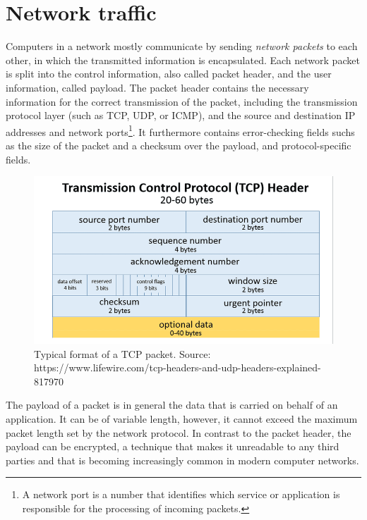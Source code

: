 
\section{Network traffic}\label{traffic}



Computers in a network mostly communicate by sending \textit{network packets} to each other, in which the transmitted information is encapsulated. Each network packet is split into the control information, also called packet header, and the user information, called payload. The packet header contains the necessary information for the correct transmission of the packet, including the transmission protocol layer (such as TCP, UDP, or ICMP), and the source and destination IP addresses and network ports\footnote{A network port is a number that identifies which service or application is responsible for the processing of incoming packets.}. It furthermore contains error-checking fields suchs as the size of the packet and a checksum over the payload, and protocol-specific fields. 


\begin{figure}[h!]
\centering
\includegraphics[scale=0.4]{images/tcp_header.png}
\caption{Typical format of a TCP packet. Source:\scriptsize{ https://www.lifewire.com/tcp-headers-and-udp-headers-explained-817970}\normalsize}
\end{figure}


The payload of a packet is in general the data that is carried on behalf of an application. It can be of variable length, however, it cannot exceed the maximum packet length set by the network protocol. In contrast to the packet header, the payload can be encrypted, a technique that makes it unreadable to any third parties and that is becoming increasingly common in modern computer networks. 


